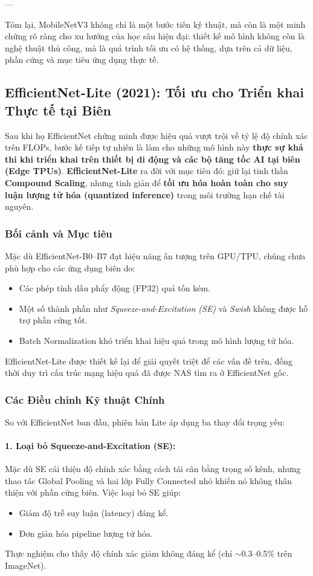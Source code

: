---

\noindent
Tóm lại, MobileNetV3 không chỉ là một bước tiến kỹ thuật, mà còn là một minh chứng rõ ràng cho xu hướng của học sâu hiện đại: thiết kế mô hình không còn là nghệ thuật thủ công, mà là quá trình tối ưu có hệ thống, dựa trên cả dữ liệu, phần cứng và mục tiêu ứng dụng thực tế.

\subsection{EfficientNet-Lite (2021): Tối ưu cho Triển khai Thực tế tại Biên}
\label{subsec:efficientnet_lite}
Sau khi họ EfficientNet chứng minh được hiệu quả vượt trội về tỷ lệ độ chính xác trên FLOPs, bước kế tiếp tự nhiên là làm cho những mô hình này \textbf{thực sự khả thi khi triển khai trên thiết bị di động và các bộ tăng tốc AI tại biên (Edge TPUs)}.  
\textbf{EfficientNet-Lite} \cite{Tan2019} ra đời với mục tiêu đó: giữ lại tinh thần \textbf{Compound Scaling}, nhưng tinh giản để \textbf{tối ưu hóa hoàn toàn cho suy luận lượng tử hóa (quantized inference)} trong môi trường hạn chế tài nguyên.

\subsubsection{Bối cảnh và Mục tiêu}
Mặc dù EfficientNet-B0–B7 đạt hiệu năng ấn tượng trên GPU/TPU, chúng chưa phù hợp cho các ứng dụng biên do:
\begin{itemize}
	\item Các phép tính dấu phẩy động (FP32) quá tốn kém.
	\item Một số thành phần như \textit{Squeeze-and-Excitation (SE)} và \textit{Swish} không được hỗ trợ phần cứng tốt.
	\item Batch Normalization khó triển khai hiệu quả trong mô hình lượng tử hóa.
\end{itemize}
EfficientNet-Lite được thiết kế lại để giải quyết triệt để các vấn đề trên, đồng thời duy trì cấu trúc mạng hiệu quả đã được NAS tìm ra ở EfficientNet gốc.

\subsubsection{Các Điều chỉnh Kỹ thuật Chính}
So với EfficientNet ban đầu, phiên bản Lite áp dụng ba thay đổi trọng yếu:

\paragraph{1. Loại bỏ Squeeze-and-Excitation (SE):}
Mặc dù SE cải thiện độ chính xác bằng cách tái cân bằng trọng số kênh, nhưng thao tác Global Pooling và hai lớp Fully Connected nhỏ khiến nó không thân thiện với phần cứng biên.  
Việc loại bỏ SE giúp:
\begin{itemize}
	\item Giảm độ trễ suy luận (latency) đáng kể.
	\item Đơn giản hóa pipeline lượng tử hóa.
\end{itemize}
Thực nghiệm cho thấy độ chính xác giảm không đáng kể (chỉ $\sim$0.3–0.5\% trên ImageNet).

